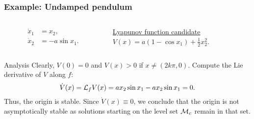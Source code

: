 \begin{frame}
    \frametitle{Example: Undamped pendulum}

    \begin{columns}
        \begin{column}{0.5\textwidth}
            \begin{align*}
                \dot{x}_1 &= x_2, \\
                \dot{x}_2 &= -a \sin{x_1}.
            \end{align*}
        \end{column}
        \begin{column}{0.5\textwidth}
            \underline{Lyapunov function candidate}\\[0.75ex]
            $ V(x) = a(1 - \cos{x_1}) + \frac{1}{2}x_2^2. $
        \end{column}
    \end{columns}
    \begin{block}{Analysis}
        Clearly, $V(0) = 0$ and $V(x) > 0$ if $x \neq (2 k \pi, 0)$. Compute the 
        Lie derivative of $V$ along $f$:
        \[ \dot{V}(x) = \mathcal{L}_fV(x) = a x_2 \sin{x_1} - a x_2 \sin{x_1} = 0. \]
        Thus, the origin is stable. Since $\dot{V}(x) \equiv 0$, we conclude
        that the origin is not asymptotically stable as solutions starting on
        the level set $\mathcal{M}_c$ remain in that set.
    \end{block}
\end{frame}


